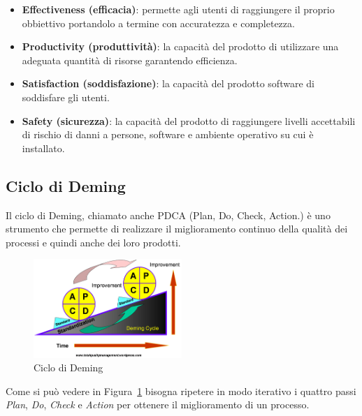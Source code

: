 \begin{itemize}
	\item \textbf{Effectiveness (efficacia)}:  permette agli utenti di raggiungere il proprio obbiettivo portandolo a termine con accuratezza e completezza.

	\item \textbf{Productivity (produttività)}: la capacità del prodotto di utilizzare una adeguata quantità di risorse garantendo efficienza.

	\item \textbf{Satisfaction (soddisfazione)}: la capacità del prodotto software di soddisfare gli utenti.

	\item \textbf{Safety (sicurezza)}: la capacità del prodotto di raggiungere livelli accettabili di rischio di danni a persone, software e ambiente operativo su cui è installato.
\end{itemize}

\subsection{Ciclo di Deming}
Il ciclo di Deming, chiamato anche PDCA (Plan, Do, Check, Action.) è uno strumento che permette di realizzare il miglioramento continuo della qualità dei processi e quindi anche dei loro prodotti.

\begin{figure}[h!]
	\centering
	\includegraphics[width=0.50\textwidth]{img/deming.png}
	\caption{Ciclo di Deming}
	\label{fig:PDCA}
\end{figure}

Come si può vedere in Figura~\ref{fig:PDCA} bisogna ripetere in modo iterativo i quattro passi \emph{Plan}, \emph{Do}, \emph{Check} e \emph{Action} per ottenere il miglioramento di un processo.


